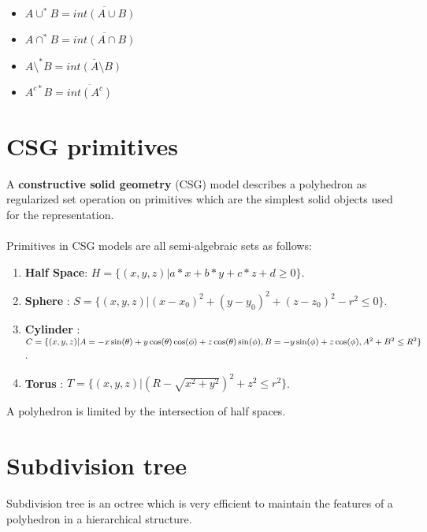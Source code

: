 \documentclass[twoside]{article}
\begin{document}
\begin{multicols}{2}
\begin{itemize}
  \item $A \cup^* B = \overline{int (A \cup B)}$
  \item $A \cap^* B = \overline{int (A \cap B)}$
  \item $A \setminus^* B = \overline{int (A \setminus B)}$
  \item $A^{c*} B = \overline{int (A^c)}$
 \end{itemize}


\section{CSG primitives}

\begin{comment}Just as a polyhedron can be described as the intersection of half spaces, 
\end{comment}

A \textbf{constructive solid geometry} (CSG) model describes a polyhedron as regularized set operation on primitives which are the simplest solid objects used for the representation.
      \\
      \\
      \indent
Primitives in CSG models are all semi-algebraic sets as follows:
\begin{enumerate}
      \item \textbf{Half Space}: $H=\{(x,y,z)|a*x+b*y+c*z+d\ge0\}$.
      \item \textbf{Sphere} : $S=\{(x,y,z)|(x-x_0)^2+(y-y_0)^2+(z-z_0)^2-r^2\le0\}$. 
      \item \textbf{Cylinder} : $C=\{(x,y,z)|A=-x\sin(\theta)+y\cos(\theta)\cos(\phi)+z\cos(\theta)\sin(\phi), \\
B=-y\sin(\phi)+ z\cos(\phi),A^2+B^2\le R^2\}$.
      \item \textbf{Torus} : $T=\{(x,y,z)|(R-\sqrt{x^2+y^2})^2+z^2\le r^2\}$. 

      
\end{enumerate}
A polyhedron is limited by the intersection of half spaces.



\section {Subdivision tree}

Subdivision tree is an octree which is very efficient to maintain the features of a polyhedron in a hierarchical structure.


\end{multicols}
\end{document}
